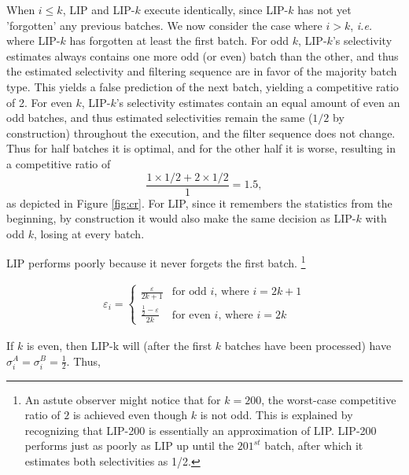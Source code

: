 When $i \leq k$, LIP and LIP-$k$ execute identically, since LIP-$k$ has not yet 'forgotten' any previous batches. We now consider the case where $i > k$, {\it i.e.} where LIP-$k$ has forgotten at least the first batch. For odd $k$, LIP-$k$'s selectivity estimates always contains one more odd (or even) batch than the other, and thus the estimated selectivity and filtering sequence are in favor of the majority batch type. This yields a false prediction of the next batch, yielding a competitive ratio of 2. For even $k$, LIP-$k$'s selectivity estimates contain an equal amount of even an odd batches,  and thus estimated selectivities remain the same ($1/2$ by construction) throughout the execution, and the filter sequence does not change. Thus for half batches it is optimal, and for the other half it is worse, resulting in a competitive ratio of \[ \frac{1 \times 1/2 + 2 \times 1/2}{1} = 1.5,\] as depicted in Figure \ref{fig:cr}. For LIP, since it remembers the statistics from the beginning, by construction it would also make the same decision as LIP-$k$ with odd $k$, losing at every batch. 

LIP performs poorly because it never forgets the first batch.
\footnote{An astute observer might notice that for $k = 200$, the worst-case competitive ratio of $2$ is achieved even though $k$ is not odd. This is explained by recognizing that LIP-200 is essentially an approximation of LIP. LIP-200 performs just as poorly as LIP up until  the $201^{st}$ batch, after which it estimates both selectivities as 1/2.}



\begin{align*}
\varepsilon_i = 
    \begin{cases}
    \frac{\varepsilon}{2k+1} & \text{for odd $i$, where $i = 2k + 1$} \\ 
    \frac{\frac{1}{2} - \varepsilon}{2k} & \text{for even $i$, where $i = 2k$}
    \end{cases}
\end{align*}

If $k$ is even, then LIP-k will (after the first $k$ batches have been processed) have $\sigma^A_i = \sigma^B_i = \frac{1}{2}$. Thus,

